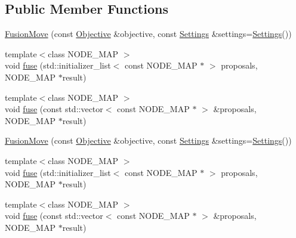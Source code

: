 \subsection*{Public Member Functions}
\begin{DoxyCompactItemize}
\item 
\hyperlink{classnifty_1_1graph_1_1FusionMove_aa5c93b404f65ab05b52d1ec5604cab0e}{Fusion\+Move} (const \hyperlink{classnifty_1_1graph_1_1FusionMove_a1318f004b56344164b0845f7c826e9db}{Objective} \&objective, const \hyperlink{structnifty_1_1graph_1_1FusionMove_1_1Settings}{Settings} \&settings=\hyperlink{structnifty_1_1graph_1_1FusionMove_1_1Settings}{Settings}())
\item 
{\footnotesize template$<$class N\+O\+D\+E\+\_\+\+M\+A\+P $>$ }\\void \hyperlink{classnifty_1_1graph_1_1FusionMove_a7b682be299909d48945b0c7b9ba1c036}{fuse} (std\+::initializer\+\_\+list$<$ const N\+O\+D\+E\+\_\+\+M\+A\+P $\ast$ $>$ proposals, N\+O\+D\+E\+\_\+\+M\+A\+P $\ast$result)
\item 
{\footnotesize template$<$class N\+O\+D\+E\+\_\+\+M\+A\+P $>$ }\\void \hyperlink{classnifty_1_1graph_1_1FusionMove_a081cef8ebd289380828f709de6edf520}{fuse} (const std\+::vector$<$ const N\+O\+D\+E\+\_\+\+M\+A\+P $\ast$ $>$ \&proposals, N\+O\+D\+E\+\_\+\+M\+A\+P $\ast$result)
\item 
\hyperlink{classnifty_1_1graph_1_1FusionMove_aa5c93b404f65ab05b52d1ec5604cab0e}{Fusion\+Move} (const \hyperlink{classnifty_1_1graph_1_1FusionMove_a1318f004b56344164b0845f7c826e9db}{Objective} \&objective, const \hyperlink{structnifty_1_1graph_1_1FusionMove_1_1Settings}{Settings} \&settings=\hyperlink{structnifty_1_1graph_1_1FusionMove_1_1Settings}{Settings}())
\item 
{\footnotesize template$<$class N\+O\+D\+E\+\_\+\+M\+A\+P $>$ }\\void \hyperlink{classnifty_1_1graph_1_1FusionMove_a7b682be299909d48945b0c7b9ba1c036}{fuse} (std\+::initializer\+\_\+list$<$ const N\+O\+D\+E\+\_\+\+M\+A\+P $\ast$ $>$ proposals, N\+O\+D\+E\+\_\+\+M\+A\+P $\ast$result)
\item 
{\footnotesize template$<$class N\+O\+D\+E\+\_\+\+M\+A\+P $>$ }\\void \hyperlink{classnifty_1_1graph_1_1FusionMove_a081cef8ebd289380828f709de6edf520}{fuse} (const std\+::vector$<$ const N\+O\+D\+E\+\_\+\+M\+A\+P $\ast$ $>$ \&proposals, N\+O\+D\+E\+\_\+\+M\+A\+P $\ast$result)
\end{DoxyCompactItemize}


